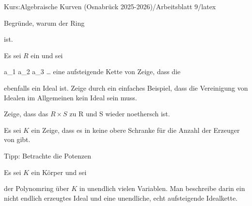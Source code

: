 Kurs:Algebraische Kurven (Osnabrück 2025-2026)/Arbeitsblatt 9/latex
\setcounter{section}{9}








{}
{




Begründe, warum der Ring

 {  }

ist.




}
{} {}


{}
{




Es sei $R$ ein
und sei

\mavergleichskettedisp
{\vergleichskette
{ {\mathfrak a}_1
}
{ \subseteq} { {\mathfrak a}_2
}
{ \subseteq} { {\mathfrak a}_3
}
{ \subseteq} { \ldots
}
{ } {
}
}
{}{}{}
eine aufsteigende Kette von
Zeige, dass die

 ebenfalls ein Ideal ist. Zeige durch ein einfaches Beispiel, dass die Vereinigung von Idealen im Allgemeinen kein Ideal sein muss.




}
{} {}


{}
{




Zeige, dass das
$R \times S$ zu
\mathkor {} {R} {und} {S} {}
wieder noethersch ist.




}
{} {}


{}
{




Es sei $K$ ein
 Zeige, dass es in
 keine obere Schranke für die Anzahl der Erzeuger von
 {} {}
gibt.




}
{} {Tipp: Betrachte die Potenzen
}


{}
{




Es sei $K$ ein Körper und sei

 {  }

der Polynomring über $K$ in unendlich vielen Variablen. Man beschreibe darin ein nicht endlich erzeugtes Ideal und eine unendliche, echt aufsteigende Idealkette.




}
{} {}


